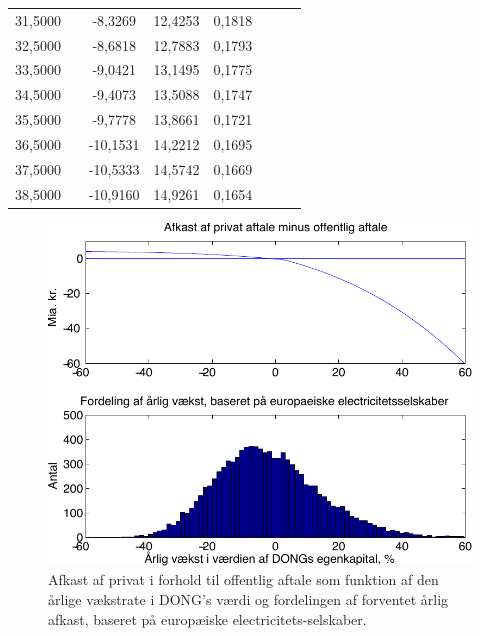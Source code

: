 \documentclass{article}
\begin{document}
\begin{table}[h]
\begin{center}
\begin{tabular}{cXcccccr}
31{,}5000&&-8{,}3269&12{,}4253& 0{,}1818\\
32{,}5000&&-8{,}6818&12{,}7883& 0{,}1793\\
33{,}5000&&-9{,}0421&13{,}1495& 0{,}1775\\
34{,}5000&&-9{,}4073&13{,}5088& 0{,}1747\\
35{,}5000&&-9{,}7778&13{,}8661& 0{,}1721\\
36{,}5000&&-10{,}1531&14{,}2212& 0{,}1695\\
37{,}5000&&-10{,}5333&14{,}5742& 0{,}1669\\
38{,}5000&&-10{,}9160&14{,}9261& 0{,}1654\\
		\bottomrule[1pt]
	\end{tabular}
\end{center}
\end{table}


\begin{figure}
\caption{Afkast af privat i forhold til offentlig aftale som funktion af den årlige v\ae{}kstrate i DONG's v\ae{}rdi og fordelingen af forventet \aa{}rlig afkast, baseret p\aa{} europ\ae{}iske electricitets-selskaber.}
\label{fig:combine1}
\centerline{\includegraphics[scale=0.8]{../matlab/figs/afkast_hist_combine_elec_guan}}
\end{figure}
\end{document}
